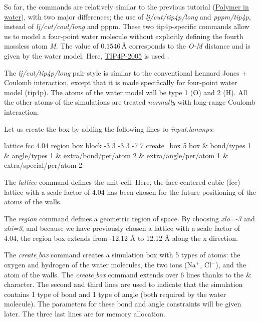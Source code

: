 \vspace{0.25cm} \noindent So far, the commands are relatively similar to the 
previous tutorial (\hyperref[all-atoms-label]{Polymer in water}),
with two major differences; the use of \textit{lj/cut/tip4p/long}
and \textit{pppm/tip4p}, instead of \textit{lj/cut/coul/long} and pppm.
These two tip4p-specific commands allow us to 
model a four-point water molecule without explicitly 
defining the fourth massless atom \textit{M}. The value of 
$0.1546\,\text{$\text{\AA{}}$}$ corresponds
to the \textit{O-M} distance and is 
given by the water model. Here, \href{http://www.sklogwiki.org/SklogWiki/index.php/TIP4P/2005_model_of_water}{TIP4P-2005} is used \cite{abascal2005general}.

\begin{tcolorbox}[colback=mylightblue!5!white,colframe=mylightblue!75!black,title=About lj/cut/tip4p/long pair style]

\vspace{0.25cm} \noindent The \textit{lj/cut/tip4p/long} pair style is similar to the conventional 
Lennard Jones + Coulomb interaction, except that it is made specifically 
for four-point water model (tip4p). The atoms of the water model
will be type 1 (O) and 2 (H). All the other atoms of the simulations 
are treated \textit{normally} with long-range Coulomb interaction.
\end{tcolorbox}

\noindent Let us create the box by adding the following lines to \textit{input.lammps}:

\begin{lcverbatim}
lattice fcc 4.04
region box block -3 3 -3 3 -7 7
create_box 5 box &
bond/types 1 &
angle/types 1 &
extra/bond/per/atom 2 &
extra/angle/per/atom 1 &
extra/special/per/atom 2
\end{lcverbatim}

\noindent The \textit{lattice} command defines the unit
cell. Here, the face-centered cubic (fcc) lattice with a scale factor of
4.04 has been chosen for the future positioning of the atoms
of the walls.

\vspace{0.25cm} \noindent The \textit{region} command defines a geometric
region of space. By choosing \textit{xlo=-3} and \textit{xhi=3}, and
because we have previously chosen a lattice with a scale
factor of 4.04, the region box extends from -12.12 Å to 12.12 Å
along the x direction.

\vspace{0.25cm} \noindent The \textit{create$\_$box} command creates a simulation box with 5 types of atoms:
the oxygen and hydrogen of the water molecules,
the two ions ($\text{Na}^+$,
$\text{Cl}^-$), and the
atom of the walls. The \textit{create$\_$box} command extends over 6 lines thanks to the
$\&$ character. The second and third lines are used to
indicate that the simulation contains 1 type of bond and 1
type of angle (both required by the water molecule). The parameters for
these bond and angle constraints will be given later. The
three last lines are for memory allocation.

